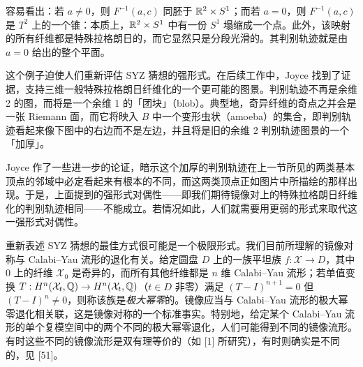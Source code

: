 容易看出：若 $a\ne0$，则 $F^{-1}(a,c)$ 同胚于 $\mathbb{R}^2\times S^1$；而若 $a=0$，则 $F^{-1}(a,c)$ 是 $T^2$ 上的一个锥：本质上，$\mathbb{R}^2\times S^1$ 中有一份 $S^1$ 塌缩成一个点。此外，该映射的所有纤维都是特殊拉格朗日的，而它显然只是分段光滑的。其判别轨迹就是由 $a=0$ 给出的整个平面。


这个例子迫使人们重新评估 SYZ 猜想的强形式。在后续工作中，Joyce 找到了证据，支持三维一般特殊拉格朗日纤维化的一个更可能的图景。判别轨迹不再是余维 2 的图，而将是一个余维 1 的「团块」（blob）。典型地，奇异纤维的奇点之并会是一张 Riemann 面，而它将映入 $B$ 中一个变形虫状（amoeba）的集合，即判别轨迹看起来像下图中的右边而不是左边，并且将是旧的余维 2 判别轨迹图景的一个「加厚」。




Joyce 作了一些进一步的论证，暗示这个加厚的判别轨迹在上一节所见的两类基本顶点的邻域中必定看起来有根本的不同，而这两类顶点正如图片中所描绘的那样出现。于是，上面提到的强形式对偶性------即我们期待镜像对上的特殊拉格朗日纤维化的判别轨迹相同------不能成立。若情况如此，人们就需要用更弱的形式来取代这一强形式对偶性。

重新表述 SYZ 猜想的最佳方式很可能是一个极限形式。我们目前所理解的镜像对称与 Calabi--Yau 流形的退化有关。给定圆盘 $D$ 上的一族平坦族 $f:\mathcal{X}\to D$，其中 $0$ 上的纤维 $\mathcal{X}_0$ 是奇异的，而所有其他纤维都是 $n$ 维 Calabi--Yau 流形；若单值变换 $T:H^n(\mathcal{X}_t,\mathbb{Q})\to H^n(\mathcal{X}_t,\mathbb{Q})$（$t\in D$ 非零）满足 $(T-I)^{n+1}=0$ 但 $(T-I)^n\ne0$，则称该族是\emph{极大幂零}的。镜像应当与 Calabi--Yau 流形的极大幂零退化相关联，这是镜像对称的一个标准事实。特别地，给定某个 Calabi--Yau 流形的单个复模空间中的两个不同的极大幂零退化，人们可能得到不同的镜像流形。有时这些不同的镜像流形是双有理等价的（如 [1] 所研究），有时则确实是不同的，见 [51]。


